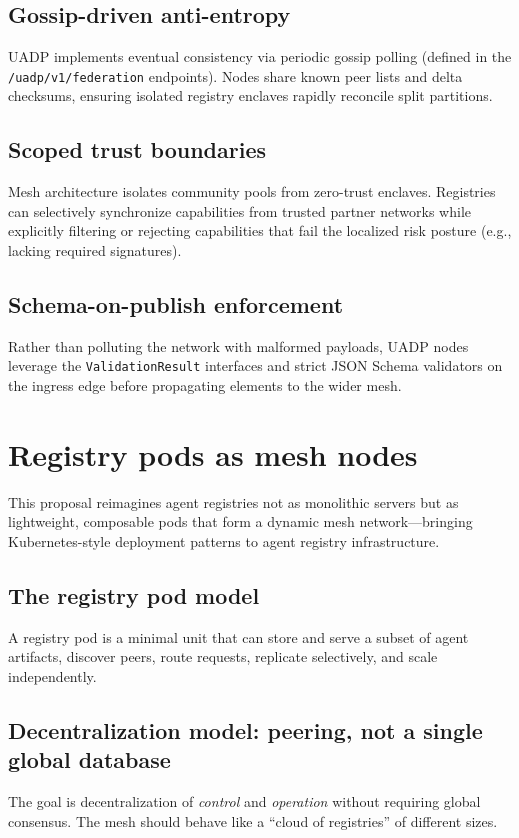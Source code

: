 \documentclass[11pt]{article}
\begin{document}
\subsection{Gossip-driven anti-entropy}
UADP implements eventual consistency via periodic gossip polling (defined in the \texttt{/uadp/v1/federation} endpoints). Nodes share known peer lists and delta checksums, ensuring isolated registry enclaves rapidly reconcile split partitions.

\subsection{Scoped trust boundaries}
Mesh architecture isolates community pools from zero-trust enclaves. Registries can selectively synchronize capabilities from trusted partner networks while explicitly filtering or rejecting capabilities that fail the localized risk posture (e.g., lacking required signatures).

\subsection{Schema-on-publish enforcement}
Rather than polluting the network with malformed payloads, UADP nodes leverage the \texttt{ValidationResult} interfaces and strict JSON Schema validators on the ingress edge before propagating elements to the wider mesh.

\section{Registry pods as mesh nodes}
This proposal reimagines agent registries not as monolithic servers but as lightweight, composable pods that form a dynamic mesh network---bringing Kubernetes-style deployment patterns to agent registry infrastructure.

\subsection{The registry pod model}
A registry pod is a minimal unit that can store and serve a subset of agent artifacts, discover peers, route requests, replicate selectively, and scale independently.

\subsection{Decentralization model: peering, not a single global database}
The goal is decentralization of \emph{control} and \emph{operation} without requiring global consensus. The mesh should behave like a ``cloud of registries'' of different sizes.
\end{document}
